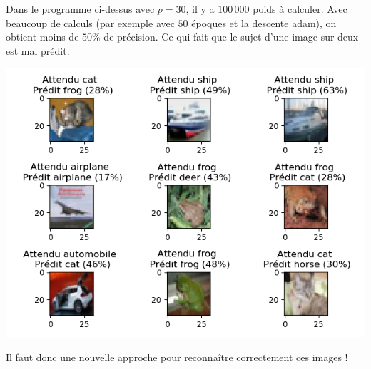 \documentclass[11pt,class=report,crop=false]{standalone}
\begin{document}
Dans le programme ci-dessus avec $p=30$, il y a $100\,000$ poids à calculer.
Avec beaucoup de calculs (par exemple avec $50$ époques et la descente \og{}adam\fg{}), on obtient moins de $50\%$ de précision. Ce qui fait que le sujet d'une image sur deux est mal prédit.


\begin{center}
\includegraphics[scale=\myscale,scale=0.7]{figures/tf2-images-test}
\end{center}

Il faut donc une nouvelle approche pour reconnaître correctement ces images !
\end{document}

